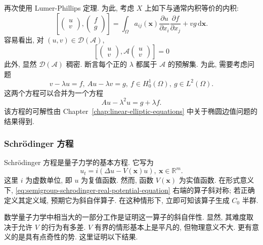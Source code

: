 \begin{Proof}
再次使用 Lumer-Phillips 定理. 为此, 考虑 $X$ 上如下与通常内积等价的内积:
\begin{equation}\label{eq:semigroup-wave-energy-inner-product}
\left[\begin{pmatrix}u\\v\end{pmatrix},\begin{pmatrix}f\\g\end{pmatrix}\right]=\int_\Omega a_{ij}(\bm{x})\dfrac{\partial u}{\partial x_i}\dfrac{\partial f}{\partial x_j}+vg\,\mathrm{d}\bm{x}.
\end{equation}
容易看出, 对 $(u,v)\in\mathcal{D}(\mathcal{A})$,
\begin{equation}\label{eq:semigroup-wave-generator-energy-skew-pairing}
\left[\begin{pmatrix}u\\v\end{pmatrix},\mathcal{A}\begin{pmatrix}u\\v\end{pmatrix}\right]=0
\end{equation}
此外, 显然 $\mathcal{D}(\mathcal{A})$ 稠密. 断言每个正的 $\lambda$ 都属于 $\mathcal{A}$ 的预解集. 为此, 需要考虑问题
\begin{equation}\label{eq:semigroup-wave-resolvent-coupled-equations}
v-\lambda u=f,\ Au-\lambda v=g,\ f\in H_0^1(\Omega),\ g\in L^2(\Omega).
\end{equation}
这两个方程可以合并为一个方程
\begin{equation}\label{eq:semigroup-wave-resolvent-reduced-elliptic-equation}
Au-\lambda^2u=g+\lambda f.
\end{equation}
该方程的可解性由 Chapter~\ref{chap:linear-elliptic-equations} 中关于椭圆边值问题的结果得到.
\end{Proof}

\subsubsection{Schrödinger 方程}\label{subsec:semigroup-schrodinger-equation}

Schrödinger 方程是量子力学的基本方程. 它写为
\begin{equation}\label{eq:semigroup-schrodinger-real-potential-equation}
u_t=i(\Delta u-V(\bm{x})u),\ \bm{x}\in\mathbb{R}^m.
\end{equation}
这里 $i$ 为虚数单位, 即 $u$ 为复值函数. 然而, 函数 $V(\bm{x})$ 为实值函数. 在形式意义下, \eqref{eq:semigroup-schrodinger-real-potential-equation} 右端的算子斜对称; 若正确定义其定义域, 预期它为斜自伴算子. 在这种情形下, 立即可知该算子生成 $C_0$ 半群.\par 数学量子力学中相当大的一部分工作是证明这一算子的斜自伴性. 显然, 其难度取决于允许 $V$ 的行为有多差. $V$ 有界的情形基本上是平凡的, 但物理意义不大. 更有意义的是具有点奇性的势. 这里证明以下结果.


